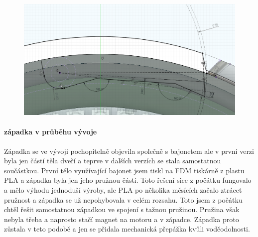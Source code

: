 \begin{figure}[htbp]
    \centering
    \includegraphics[width=\textwidth]{kapitoly/obrazky/E4/zapadka/uhel_cela.png}
    \caption{}
    \label{fig:uhel_cela_zapadky}
\end{figure}

\newpage
\paragraph{západka v průběhu vývoje}

Západka se ve vývoji pochopitelně objevila společně s bajonetem ale v první verzi byla jen částí těla dveří a teprve v dalších verzích se stala
samostatnou součástkou. První tělo využívající bajonet jsem tiskl na FDM tiskárně z plastu PLA a západka byla jen jeho pružnou částí. Toto řešení sice 
z počátku fungovalo a mělo výhodu jednoduší výroby, ale PLA po několika měsících začalo ztrácet pružnost a západka se už nepohybovala v celém rozsahu.
Toto jsem z počátku chtěl řešit samostatnou západkou ve spojení s tažnou pružinou. Pružina však nebyla třeba a naprosto stačí magnet na motoru a v západce.
Západka proto zůstala v teto podobě a jen se přidala mechanická přepážka kvůli voděodolnosti. 

